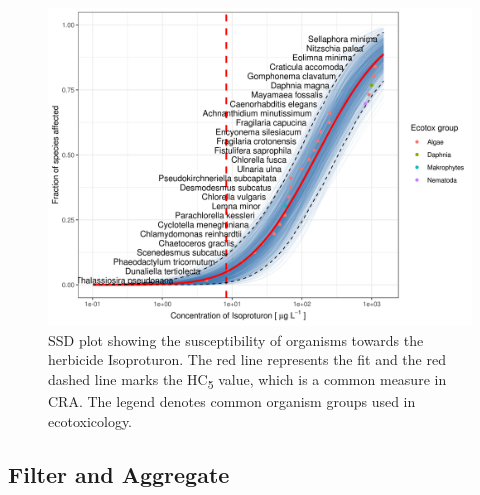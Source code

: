 \begin{figure}[h!]
    \dentering
    \includegraphics[width=1\linewidth]{article/figures/ssd2_boot.png}
    \caption{SSD plot showing the susceptibility of organisms towards the herbicide Isoproturon. The red line represents the fit and the red dashed line marks the HC\textsubscript{5} value, which is a common measure in CRA. The legend denotes common organism groups used in ecotoxicology.}
    \label{fig:ssd-isoproturon}
\end{figure}

\subsection*{Filter and Aggregate}

